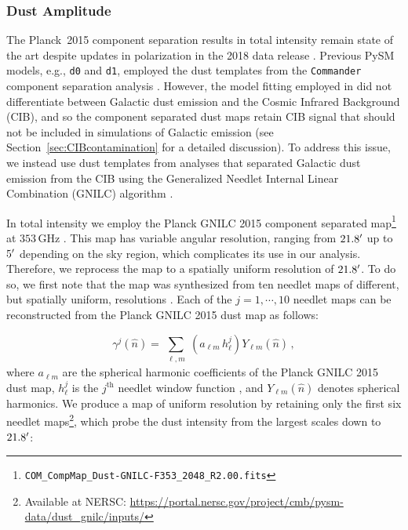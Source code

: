 \documentclass[twocolumn]{aastex631}
\begin{document}
\subsubsection{Dust Amplitude}\label{sec:dustamplitude}
The Planck~2015 component separation results in total intensity remain state of the art despite updates in polarization in the 2018 data release \citep{planck2016-l04}. Previous PySM models, e.g., \texttt{d0} and \texttt{d1}, employed the dust templates from the \texttt{Commander} component separation analysis \citep{planck2014-a11}. However, the model fitting employed in \citet{planck2014-a11} did not differentiate between Galactic dust emission and the Cosmic Infrared Background (CIB), and so the component separated dust maps retain CIB signal that should not be included in simulations of Galactic emission (see Section~\ref{sec:CIBcontamination} for a detailed discussion). To address this issue, we instead use dust templates from analyses that separated Galactic dust emission from the CIB using the Generalized Needlet Internal Linear Combination (GNILC) algorithm \citep{Remazeilles:2011}. 

In total intensity we employ the Planck GNILC 2015 component separated map\footnote{\texttt{COM\_CompMap\_Dust-GNILC-F353\_2048\_R2.00.fits}} at $353$\,GHz \citep{planck2016-XLVIII}. This map has variable angular resolution, ranging from $21.8\mbox{$^\prime$}$ up to $5\mbox{$^\prime$}$ depending on the sky region, which complicates its use in our analysis. Therefore, we reprocess the map to a spatially uniform resolution of $21.8\mbox{$^\prime$}$. To do so, we first note that the map was synthesized from ten needlet maps of different, but spatially uniform, resolutions \citep[][Figure~A.2]{planck2016-XLVIII}. Each of the $j=1,\cdots,10$ needlet maps can be reconstructed from the Planck GNILC 2015 dust map as follows:

\begin{equation}
\gamma^{j}(\hat{n})
=\sum_{\substack{\ell,m}} \left(a_{\ell m}\, h^{j}_\ell\right)Y_{\ell m}(\hat{n})\,,
\label{eq:needlets_maps}
\end{equation}
where $a_{\ell m}$ are the spherical harmonic coefficients of the Planck GNILC 2015 dust map,  $h^{j}_\ell$ is the $j^\text{th}$ needlet window function \citep[see][Figure~A.2]{planck2016-XLVIII}, and $Y_{\ell m}(\hat{n})$ denotes spherical harmonics. We produce a map of uniform resolution by retaining only the first six needlet maps\footnote{Available at NERSC: \url{https://portal.nersc.gov/project/cmb/pysm-data/dust_gnilc/inputs/}}, which probe the dust intensity from the largest scales down to $21.8\mbox{$^\prime$}$:
\end{document}
